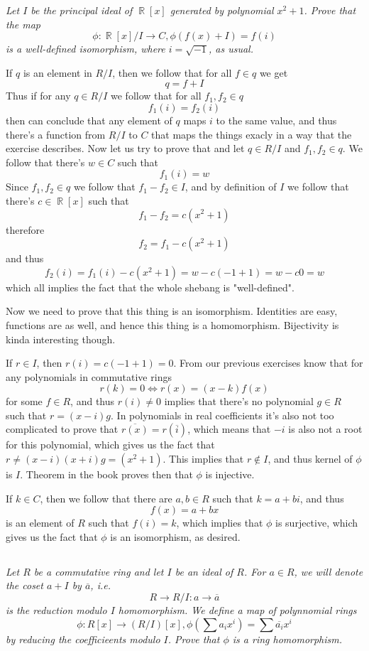 \documentclass[11pt,oneside,titlepage]{book}
\DeclareMathOperator \real {\mathbb {R}}
\begin{document}
\textit{Let $I$ be the principal ideal of $\real[x]$ generated by
  polynomial $x^2 + 1$. Prove that the map
  $$\phi: \real[x]/I \to C, \phi(f(x) + I) = f(i)$$
  is a well-defined isomorphism, where $i = \sqrt{-1}$, as usual.}

If $q$ is an element in $R/I$, then we follow that for all $f \in q$ we get
$$q = f + I$$
Thus if for any $q \in R/I$ we follow that for all $f_1, f_2 \in q$
$$f_1(i) = f_2(i)$$
then can conclude that any element of $q$ maps $i$ to the same value,
and thus there's a function from $R/I$ to $C$ that maps the things
exacly in a way that the exercise describes. Now let us try to prove
that and let $q \in R/I$ and $f_1, f_2 \in q$. We follow that there's
$w \in C$ such that
$$f_1(i) = w$$
Since $f_1, f_2 \in q$ we follow that $f_1 - f_2 \in I$, and by
definition of $I$ we follow that there's $c \in \real[x]$ such that
$$f_1 - f_2 = c(x^2 + 1)$$
therefore
$$f_2 = f_1 - c(x^2 + 1)$$
and thus
$$f_2(i) = f_1(i) - c(x^2 + 1) = w - c(-1 + 1) = w - c0 = w$$
which all implies the fact that the whole shebang is "well-defined".

Now we need to prove that this thing is an isomorphism. Identities are
easy, functions are as well, and hence this thing is a
homomorphism. Bijectivity is kinda interesting though.

If $r \in I$, then $r(i) = c(-1 + 1) = 0$. From our previous exercises
know that for any polynomials in commutative rings
$$r(k) = 0 \iff r(x) = (x - k)f(x)$$
for some $f \in R$, and thus $r(i) \neq 0$ implies that there's no
polynomial $g \in R$ such that $r = (x - i) g$. In polynomials in real
coefficients it's also not too complicated to prove that
$\overline{r(x)} = r(\overline{i})$, which means that $-i$ is also not
a root for this polynomial, which gives us the fact that $r \neq (x -
i) (x + i) g = (x^2 + 1)$.  This implies that $r \notin I$, and thus
kernel of $\phi$ is $I$. Theorem in the book proves then that $\phi$
is injective.

If $k \in C$, then we follow that there are $a, b \in R$ such that $k
= a + bi$, and thus
$$f(x) = a + bx$$
is an element of $R$ such that $f(i) = k$, which implies that $\phi$
is surjective, which gives us the fact that $\phi$ is an isomorphism,
as desired.

\subsection{}

\textit{Let $R$ be a commutative ring and let $I$ be an ideal of
  $R$. For $a \in R$, we will denote the coset $a + I$ by
  $\overline{a}$, i.e.
  $$R \to R/I: a \to \overline{a}$$
  is the reduction modulo $I$ homomorphism. We define a map of
  polynnomial rings
  $$\phi: R[x] \to (R/I)[x], \phi(\sum {a_i x^i}) = \sum {\overline{a_i} x^i}$$
  by reducing the coefficieents modulo $I$. Prove that $\phi$ is a ring
  homomorphism.}
\end{document}
